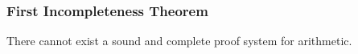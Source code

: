 \documentclass{beamer}
\DeclareMathOperator{\Th}{Th}
\begin{document}
%

\begin{frame}
\frametitle{First Incompleteness Theorem}
\begin{theorem}[1931]
    There cannot exist a sound and complete proof system for
    arithmetic.
\end{theorem}
\end{frame}
\end{document}
